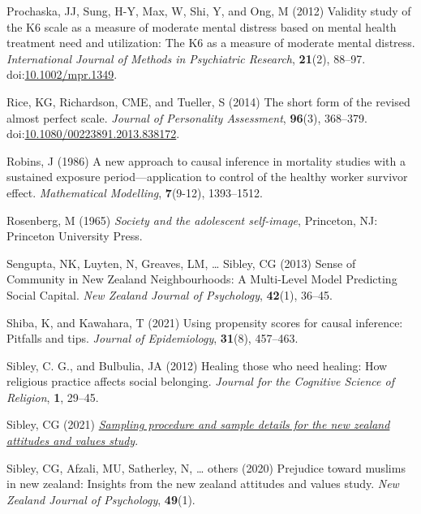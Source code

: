 \documentclass[
  single column]{article}
\newlength{\cslhangindent}
\newenvironment{CSLReferences}[2] %
 {\begin{list}{}{%
  \setlength{\itemindent}{0pt}
  \setlength{\leftmargin}{0pt}
  \setlength{\parsep}{0pt}
  \ifodd #1
   \setlength{\leftmargin}{\cslhangindent}
   \setlength{\itemindent}{-1\cslhangindent}
  \fi
  \setlength{\itemsep}{#2\baselineskip}}}
 {\end{list}}
\begin{document}
\begin{CSLReferences}{1}{0}
Prochaska, JJ, Sung, H-Y, Max, W, Shi, Y, and Ong, M (2012) Validity
study of the K6 scale as a measure of moderate mental distress based on
mental health treatment need and utilization: The K6 as a measure of
moderate mental distress. \emph{International Journal of Methods in
Psychiatric Research}, \textbf{21}(2), 88--97.
doi:\href{https://doi.org/10.1002/mpr.1349}{10.1002/mpr.1349}.

Rice, KG, Richardson, CME, and Tueller, S (2014) The short form of the
revised almost perfect scale. \emph{Journal of Personality Assessment},
\textbf{96}(3), 368--379.
doi:\href{https://doi.org/10.1080/00223891.2013.838172}{10.1080/00223891.2013.838172}.

Robins, J (1986) A new approach to causal inference in mortality studies
with a sustained exposure period---application to control of the healthy
worker survivor effect. \emph{Mathematical Modelling}, \textbf{7}(9-12),
1393--1512.

Rosenberg, M (1965) \emph{Society and the adolescent self-image},
Princeton, NJ: Princeton University Press.

Sengupta, NK, Luyten, N, Greaves, LM, \ldots{} Sibley, CG (2013) Sense
of Community in New Zealand Neighbourhoods: A Multi-Level Model
Predicting Social Capital. \emph{New Zealand Journal of Psychology},
\textbf{42}(1), 36--45.

Shiba, K, and Kawahara, T (2021) Using propensity scores for causal
inference: Pitfalls and tips. \emph{Journal of Epidemiology},
\textbf{31}(8), 457--463.

Sibley, C. G., and Bulbulia, JA (2012) Healing those who need healing:
How religious practice affects social belonging. \emph{Journal for the
Cognitive Science of Religion}, \textbf{1}, 29--45.

Sibley, CG (2021)
\emph{\href{https://doi.org/10.31234/osf.io/wgqvy}{Sampling procedure
and sample details for the new zealand attitudes and values study}}.

Sibley, CG, Afzali, MU, Satherley, N, \ldots{} others (2020) Prejudice
toward muslims in new zealand: Insights from the new zealand attitudes
and values study. \emph{New Zealand Journal of Psychology},
\textbf{49}(1).


\end{CSLReferences}
\end{document}
